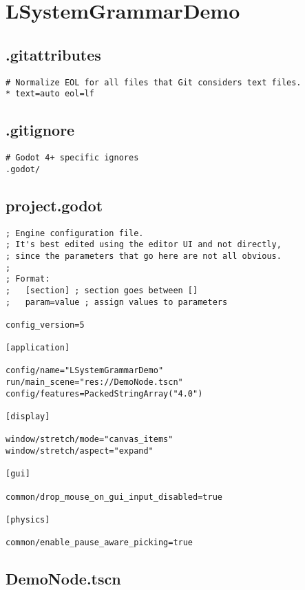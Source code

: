 \section{LSystemGrammarDemo}


\subsection{.gitattributes}

\begin{lstlisting}
# Normalize EOL for all files that Git considers text files.
* text=auto eol=lf
\end{lstlisting}

\subsection{.gitignore}

\begin{lstlisting}
# Godot 4+ specific ignores
.godot/
\end{lstlisting}

\subsection{project.godot}

\begin{lstlisting}
; Engine configuration file.
; It's best edited using the editor UI and not directly,
; since the parameters that go here are not all obvious.
;
; Format:
;   [section] ; section goes between []
;   param=value ; assign values to parameters

config_version=5

[application]

config/name="LSystemGrammarDemo"
run/main_scene="res://DemoNode.tscn"
config/features=PackedStringArray("4.0")

[display]

window/stretch/mode="canvas_items"
window/stretch/aspect="expand"

[gui]

common/drop_mouse_on_gui_input_disabled=true

[physics]

common/enable_pause_aware_picking=true
\end{lstlisting}

\subsection{DemoNode.tscn}

